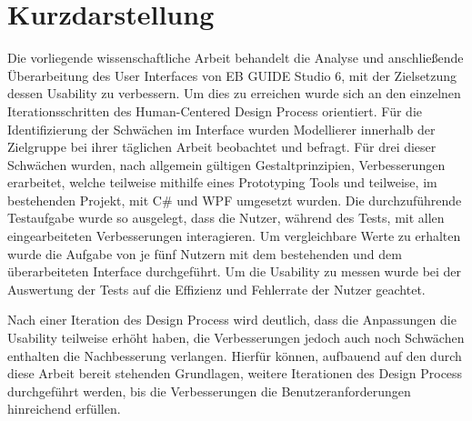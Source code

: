 \thispagestyle{empty}
\section*{Kurzdarstellung}
\label{sec:kurzdarstellung}

Die vorliegende wissenschaftliche Arbeit behandelt die Analyse und anschließende Überarbeitung des User Interfaces von EB GUIDE Studio 6, mit der Zielsetzung dessen Usability zu verbessern.
Um dies zu erreichen wurde sich an den einzelnen Iterationsschritten des Human-Centered Design Process orientiert.
Für die Identifizierung der Schwächen im Interface wurden Modellierer innerhalb der Zielgruppe bei ihrer täglichen Arbeit beobachtet und befragt.
Für drei dieser Schwächen wurden, nach allgemein gültigen Gestaltprinzipien, Verbesserungen erarbeitet, welche teilweise mithilfe eines Prototyping Tools und teilweise, im bestehenden Projekt, mit C\# und WPF umgesetzt wurden.
Die durchzuführende Testaufgabe wurde so ausgelegt, dass die Nutzer, während des Tests, mit allen eingearbeiteten Verbesserungen interagieren.
Um vergleichbare Werte zu erhalten wurde die Aufgabe von je fünf Nutzern mit dem bestehenden und dem überarbeiteten Interface durchgeführt.
Um die Usability zu messen wurde bei der Auswertung der Tests auf die Effizienz und Fehlerrate der Nutzer geachtet.

Nach einer Iteration des Design Process wird deutlich, dass die Anpassungen die Usability teilweise erhöht haben, die Verbesserungen jedoch auch noch Schwächen enthalten die Nachbesserung verlangen.
Hierfür können, aufbauend auf den durch diese Arbeit bereit stehenden Grundlagen, weitere Iterationen des Design Process durchgeführt werden, bis die Verbesserungen die Benutzeranforderungen hinreichend erfüllen.


